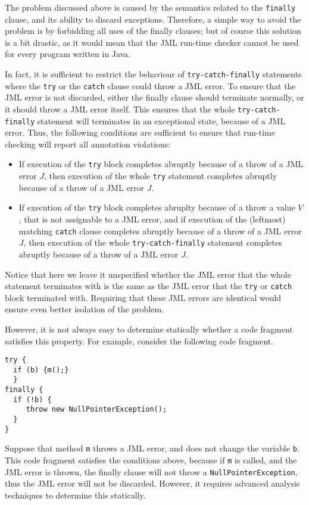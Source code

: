 \documentclass[]{llncs}
\begin{document}
The problem discussed above is caused by the semantics related to the
\texttt{finally} clause, and its ability to discard
exceptions. Therefore, a simple way to avoid the problem is by
forbidding all uses of the finally clauses; but of course this
solution is a bit drastic, as it would mean that the JML run-time checker
cannot be used for every program written in Java. 

In fact, it is sufficient to restrict the behaviour of
\texttt{try-catch-finally} statements where the \texttt{try} or the
\texttt{catch} clause could throw a JML error. To ensure that the JML
error is not discarded, either the finally clause should terminate
normally, or it should throw a JML error itself. This ensures that the
whole \texttt{try-catch-finally} statement will terminates in an
exceptional state, because of a JML error. Thus, the following
conditions are sufficient to ensure that run-time checking will report
all annotation violations:

\begin{itemize}
\item If execution of the \texttt{try} block completes abruptly because of a
throw of a JML error \(J\), then execution of the whole \texttt{try}
statement completes abruptly because of a throw of a JML error \(J\).
\item If execution of the \texttt{try} block completes abruplty
because of a throw a value \(V\), that is not assignable to a JML
error, and if execution of the (leftmost) matching \texttt{catch}
clause completes abruptly because of a throw of a JML error \(J\),
then execution of the whole \texttt{try-catch-finally} statement
completes abruptly because of a throw of a JML error \(J\).
\end{itemize}

Notice that here we leave it unspecified whether the JML error that
the whole statement terminates with is the same as the JML error that
the \texttt{try} or \texttt{catch} block terminated with. Requiring
that these JML errors are identical would ensure even better isolation
of the problem.

However, it is not always easy to determine statically whether a code
fragment satisfies this property. For example, consider the following
code fragment.
\begin{verbatim}
try {	
  if (b) {m();}
  }	
finally {
  if (!b) {
     throw new NullPointerException();
  }
}
\end{verbatim}
Suppose that method \texttt{m} throws a JML error, and does not change
the variable \texttt{b}. This code fragment satisfies the conditions
above, because if \texttt{m} is called, and the JML error is thrown,
the finally clause will not throw a \texttt{NullPointerException},
thus the JML error will not be discarded. However, it requires
advanced analysis techniques to determine this statically.
\end{document}
